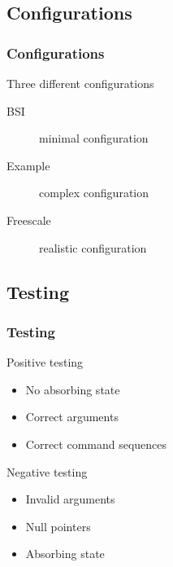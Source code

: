 \documentclass{beamer}
\begin{document}
\subsection{Configurations}

\begin{frame}
  \frametitle{Configurations}
  Three different configurations\\
  \begin{description}
    \item[BSI] minimal configuration
    \item[Example] complex configuration
    \item[Freescale] realistic configuration
  \end{description}
\end{frame}

\subsection{Testing}

\begin{frame}
  \frametitle{Testing}
  \begin{block}{Positive testing}
    \begin{itemize}
      \item No absorbing state
      \item Correct arguments
      \item Correct command sequences
    \end{itemize}
  \end{block}
  \begin{block}{Negative testing}
    \begin{itemize}
      \item Invalid arguments
      \item Null pointers
      \item Absorbing state
    \end{itemize}
  \end{block}
\end{frame}
\end{document}
